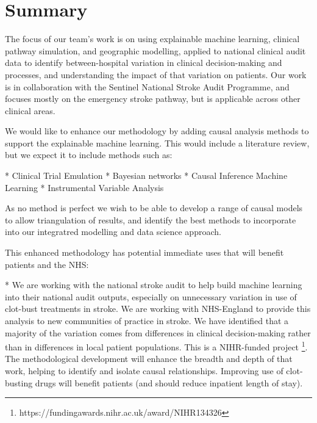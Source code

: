 \section*{Summary}


The focus of our team's work is on using explainable machine learning, clinical pathway simulation, and geographic modelling, applied to national clinical audit data to identify between-hospital variation in clinical decision-making and processes, and understanding the impact of that variation on patients. Our work is in collaboration with the Sentinel National Stroke Audit Programme, and focuses mostly on the emergency stroke pathway, but is applicable across other clinical areas.

We would like to enhance our methodology by adding causal analysis methods to support the explainable machine learning. This would include a literature review, but we expect it to include methods such as:

\begin{markdown}
* Clinical Trial Emulation
* Bayesian networks
* Causal Inference Machine Learning
* Instrumental Variable Analysis
\end{markdown}

As no method is perfect we wish to be able to develop a range of causal models to allow triangulation of results, and identify the best methods to incorporate into our integratred modelling and data science approach.

This enhanced methodology has potential immediate uses that will benefit patients and the NHS:

* We are working with the national stroke audit to help build machine learning into their national audit outputs, especially on unnecessary variation in use of clot-bust treatments in stroke. We are working with NHS-England to provide this analysis to new communities of practice in stroke. We have identified that a majority of the variation comes from differences in clinical decision-making rather than in differences in local patient populations. This is a NIHR-funded project \footnote{https://fundingawards.nihr.ac.uk/award/NIHR134326}. The methodological development will enhance the breadth and depth of that work, helping to identify and isolate causal relationships. Improving use of clot-busting drugs will benefit patients (and should reduce inpatient length of stay).

